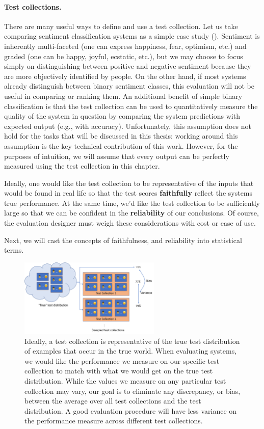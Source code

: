 \paragraph{Test collections.}
There are many useful ways to define and use a test collection.
Let us take comparing sentiment classification systems as a simple case study ().
Sentiment is inherently multi-faceted (one can express happiness, fear, optimism, etc.) and graded (one can be happy, joyful, ecstatic, etc.), but we may choose to focus simply on distinguishing between positive and negative sentiment because they are more objectively identified by people.
On the other hand, if most systems already distinguish between binary sentiment classes, this evaluation will not be useful in comparing or ranking them.
An additional benefit of simple binary classification is that the test collection can be used to quantitatively measure the quality of the system in question by comparing the system predictions with expected output (e.g., with accuracy).
Unfortunately, this assumption does not hold for the tasks that will be discussed in this thesis: working around this assumption is the key technical contribution of this work. 
However, for the purposes of intuition, we will assume that every output can be perfectly measured using the test collection in this chapter.

Ideally, one would like the test collection to be representative of the inputs that would be found in real life so that the test scores \textbf{faithfully} reflect the systems true performance.
At the same time, we'd like the test collection to be sufficiently large so that we can be confident in the \textbf{reliability} of our conclusions.
Of course, the evaluation designer must weigh these considerations with cost or ease of use.

Next, we will cast the concepts of faithfulness, and reliability into statistical terms.

\begin{figure}
  \centering
  \includegraphics[width=0.6\textwidth]{figures/bias}
  \caption[Bias and variance when evaluating with test collections]{\label{setup:bias} Ideally, a test collection is representative of the true test distribution of examples that occur in the true world.
  When evaluating systems, we would like the performance we measure on our specific test collection to match with what we would get on the true test distribution.
  While the values we measure on any particular test collection may vary, our goal is to eliminate any discrepancy, or bias, between the average over all test collections and the test distribution.
  A good evaluation procedure will have less variance on the performance measure across different test collections.
  }
\end{figure}

